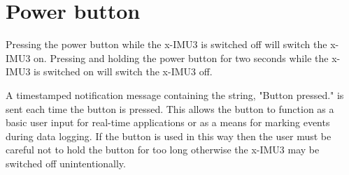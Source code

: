 \section{Power button}

Pressing the power button while the x-IMU3 is switched off will switch the x-IMU3 on.  Pressing and holding the power button for two seconds while the x-IMU3 is switched on will switch the x-IMU3 off.

A timestamped notification message containing the string, "Button pressed." is sent each time the button is pressed.  This allows the button to function as a basic user input for real-time applications or as a means for marking events during data logging.  If the button is used in this way then the user must be careful not to hold the button for too long otherwise the x-IMU3 may be switched off unintentionally.

